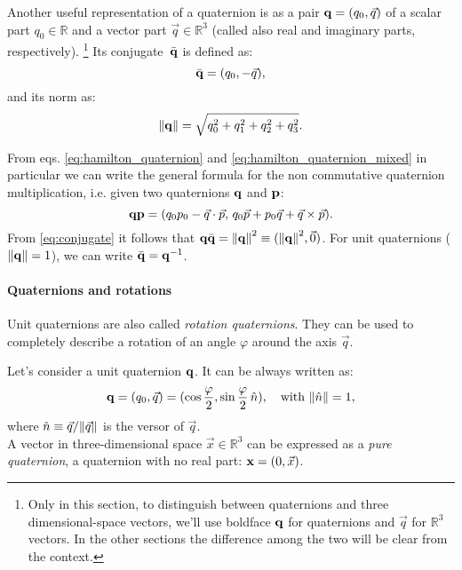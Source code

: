 Another useful representation of a quaternion is as a pair $\boldsymbol{\mathbf{q}} = (q_0, \vec q)$ of a scalar part $q_0\in \mathbb{R}$ and a vector part $\vec q \in \mathbb{R}^3$ (called also real and imaginary parts, respectively).
\footnote{Only in this section, to distinguish between quaternions and three dimensional-space vectors, we'll use boldface $\boldsymbol{\mathbf{q}}$ for quaternions and $\vec q$ for $\mathbb{R}^3$ vectors. In the other sections the difference among the two will be clear from the context.}
Its conjugate~$\bar{\boldsymbol{\mathbf{q}}}$ is defined as:
\begin{equation}
 \bar{\boldsymbol{\mathbf{q}}} = (q_0, -\vec q),
 \label{eq:conjugate}
\end{equation}
and its norm as:
\begin{equation}
 \norm{\boldsymbol{\mathbf{q}}} = \sqrt{q_0^2+q_1^2+q_2^2+q_3^2}.
\end{equation}

From eqs. \eqref{eq:hamilton_quaternion} and \eqref{eq:hamilton_quaternion_mixed} in particular we can write the general formula for the non commutative quaternion multiplication, i.e. given two quaternions $\boldsymbol{\mathbf{q}}$ and $\boldsymbol{\mathbf{p}}$:
\begin{equation}
 \boldsymbol{\mathbf{q}} \boldsymbol{\mathbf{p}} = (q_0 p_0 - \vec q \cdot \vec p, \, q_0 \vec p + p_0 \vec q + \vec q \times \vec p).
 \label{eq:quaternion_multiplication}
\end{equation}
From \eqref{eq:conjugate} it follows that $\boldsymbol{\mathbf{q}} \bar{\boldsymbol{\mathbf{q}}} = \norm{\boldsymbol{\mathbf{q}}}^2 \equiv (\norm{\boldsymbol{\mathbf{q}}}^2, \vec 0)$. For unit quaternions ($\norm{\boldsymbol{\mathbf{q}}} = 1$), we can write $\bar{\boldsymbol{\mathbf{q}}} = \boldsymbol{\mathbf{q}}^{-1}$.%

\paragraph{Quaternions and rotations} Unit quaternions are also called \emph{rotation quaternions}.
They can be used to completely describe a rotation of an angle $\varphi$ around the axis $\vec q$.

Let's consider a unit quaternion $\boldsymbol{\mathbf{q}}$. It can be always written as:
\begin{equation}
 \boldsymbol{\mathbf{q}} = (q_0, \vec q) = (\cos \frac \varphi 2, \sin \frac \varphi 2\, \hat n), \quad \text{with } \norm{\hat n}=1,
\end{equation}
where $\hat n \equiv \vec q/\norm{\vec q}$ is the versor of $\vec q$.\\
A vector in three-dimensional space $\vec x \in \mathbb R^3$ can be expressed as a \emph{pure quaternion}, a quaternion with no real part: $\boldsymbol{\mathbf{x}} = (0, \vec x)$.

